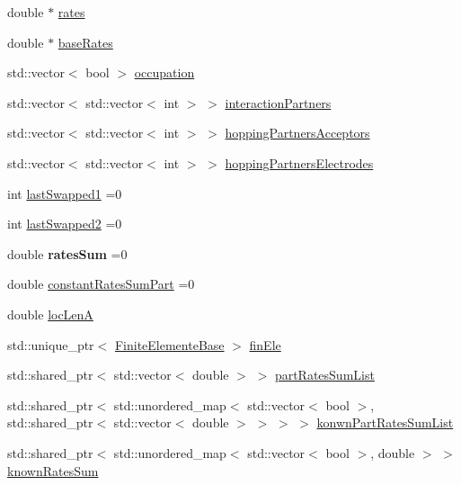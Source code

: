 \begin{DoxyCompactItemize}
double $\ast$ \hyperlink{classSystem_ad89fb08497a4d886f64a91a7d302b296}{rates}
\item 
double $\ast$ \hyperlink{classSystem_a046174e3f233b5c31249aaec257c83ff}{base\+Rates}
\item 
std\+::vector$<$ bool $>$ \hyperlink{classSystem_af13aaae75d6cff51d202b004a9fdc3d4}{occupation}
\item 
std\+::vector$<$ std\+::vector$<$ int $>$ $>$ \hyperlink{classSystem_a7938c9208ca6b86c4d1629418aabd98f}{interaction\+Partners}
\item 
std\+::vector$<$ std\+::vector$<$ int $>$ $>$ \hyperlink{classSystem_ae9ca6aa54468effc1fae57c2adc6c578}{hopping\+Partners\+Acceptors}
\item 
std\+::vector$<$ std\+::vector$<$ int $>$ $>$ \hyperlink{classSystem_a777232d4fec6f13fc7423a477f629a0f}{hopping\+Partners\+Electrodes}
\item 
int \hyperlink{classSystem_a6cae5a9a0157f7e6042bda0807879568}{last\+Swapped1} =0
\item 
int \hyperlink{classSystem_a6ddf57bedba9389eb75ffb60cad1391c}{last\+Swapped2} =0
\item 
\mbox{\label{classSystem_ad3aaea748694e196166f840d967de4fa}} 
double {\bfseries rates\+Sum} =0
\item 
double \hyperlink{classSystem_a51bded18390c13a28f8737c3b7a911bb}{constant\+Rates\+Sum\+Part} =0
\item 
double \hyperlink{classSystem_a292939d005702b34cb3d40d169b24639}{loc\+LenA}
\item 
std\+::unique\+\_\+ptr$<$ \hyperlink{classFiniteElementeBase}{Finite\+Elemente\+Base} $>$ \hyperlink{classSystem_a586a959bbcb019f061535e63d7a96852}{fin\+Ele}
\item 
std\+::shared\+\_\+ptr$<$ std\+::vector$<$ double $>$ $>$ \hyperlink{classSystem_ae1d936be9d2c423ef42a2c16dc269e6c}{part\+Rates\+Sum\+List}
\item 
std\+::shared\+\_\+ptr$<$ std\+::unordered\+\_\+map$<$ std\+::vector$<$ bool $>$, std\+::shared\+\_\+ptr$<$ std\+::vector$<$ double $>$ $>$ $>$ $>$ \hyperlink{classSystem_a9892a3f67a51872cce3577ec50a55a5d}{konwn\+Part\+Rates\+Sum\+List}
\item 
std\+::shared\+\_\+ptr$<$ std\+::unordered\+\_\+map$<$ std\+::vector$<$ bool $>$, double $>$ $>$ \hyperlink{classSystem_af23703acd38834ecb9381425724f4ca5}{known\+Rates\+Sum}
\item 
\mbox{\label{classSystem_a990aa61d9baff5dd50f6188c79609092}} 

\end{DoxyCompactItemize}
